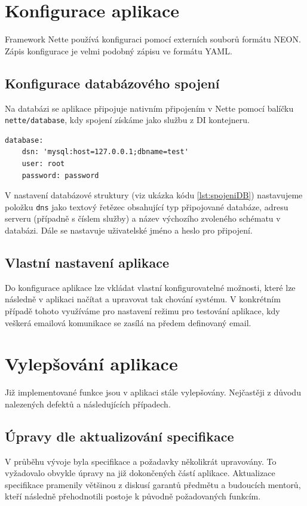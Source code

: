 \documentclass[czech,BP]{thesiskiv}
\begin{document}
	\section{Konfigurace aplikace}
	\par Framework Nette používá konfiguraci pomocí externích souborů formátu NEON. Zápis konfigurace je velmi podobný zápisu ve formátu YAML.
	\subsection{Konfigurace databázového spojení}
	\par Na databázi se aplikace připojuje nativním připojením v Nette pomocí balíčku \texttt{nette/database}, kdy spojení získáme jako službu z DI kontejneru.
\begin{minipage}{\linewidth}
		
	\begin{lstlisting}[caption={Konfigurace databázového spojení},label={lst:spojeniDB}]
database:
	dsn: 'mysql:host=127.0.0.1;dbname=test'
	user: root
	password: password
\end{lstlisting}
\end{minipage}
	\par V nastavení databázové struktury (viz ukázka kódu \ref{lst:spojeniDB}) nastavujeme položku \texttt{dns} jako textový řetězec obsahující typ připojované databáze, adresu serveru (případně s číslem služby) a název výchozího zvoleného schématu v databázi. Dále se nastavuje uživatelské jméno a heslo pro připojení.
	\subsection{Vlastní nastavení aplikace}
	\par Do konfigurace aplikace lze vkládat vlastní konfigurovatelné možnosti, které lze následně v aplikaci načítat a upravovat tak chování systému. V konkrétním případě tohoto využíváme pro nastavení režimu pro testování aplikace, kdy veškerá emailová komunikace se zasílá na předem definovaný email.
	\section{Vylepšování aplikace}
	\par Již implementované funkce jsou v aplikaci stále vylepšovány. Nejčastěji z důvodu nalezených defektů a následujících případech.
	\subsection{Úpravy dle aktualizování specifikace}
	\par V průběhu vývoje byla specifikace a požadavky několikrát upravovány. To vyžadovalo obvykle úpravy na již dokončených částí aplikace. Aktualizace specifikace pramenily většinou z diskusí garantů předmětu a budoucích mentorů, kteří následně přehodnotili postoje k původně požadovaných funkcím. 
\end{document}
